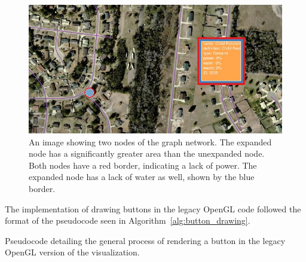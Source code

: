 \begin{figure}[htp] \centering
    \includegraphics[width=0.8\linewidth]{img/buttons.jpg}
    \caption[Buttons]{An image showing two nodes of the graph network. The expanded node has a significantly greater area than the unexpanded node. Both nodes have a red border, indicating a lack of power. The expanded node has a lack of water as well, shown by the blue border.}
    \label{fig:buttons}
\end{figure}

The implementation of drawing buttons in the legacy OpenGL code followed the format of the 
pseudocode seen in Algorithm~\ref{alg:button_drawing}.

\begin{algorithm}
    \caption{Pseudocode detailing the general process of rendering a button in the legacy OpenGL
    version of the visualization.}\label{alg:button_drawing}
    \begin{algorithmic}[1]
                \State{}
                        \State{}
                    \Else
                        \State{}
                    \EndIf
                \Else
                    \State{}
                        \State{}
                    \Else
                        \State{}
                    \EndIf
                        \State{}
                    \EndIf
                \EndIf
            \EndFor
        \EndFunction
    \end{algorithmic}
\end{algorithm}

